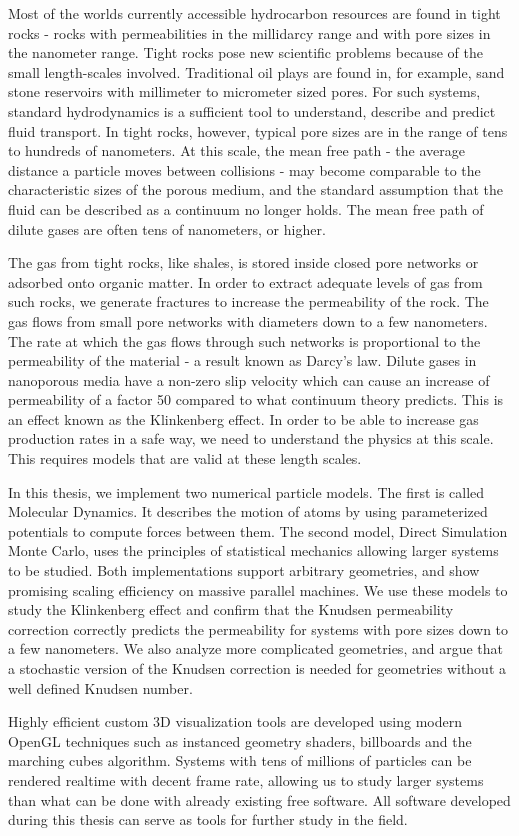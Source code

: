 Most of the worlds currently accessible hydrocarbon resources are found in tight rocks - rocks with permeabilities in the millidarcy range and with pore sizes in the nanometer range. Tight rocks pose new scientific problems because of the small length-scales involved. Traditional oil plays are found in, for example, sand stone reservoirs with millimeter to micrometer sized pores. For such systems, standard hydrodynamics is a sufficient tool to understand, describe and predict fluid transport. In tight rocks, however, typical pore sizes are in the range of tens to hundreds of nanometers. At this scale, the mean free path - the average distance a particle moves between collisions - may become comparable to the characteristic sizes of the porous medium, and the standard assumption that the fluid can be described as a continuum no longer holds. The mean free path of dilute gases are often tens of nanometers, or higher. 

The gas from tight rocks, like shales, is stored inside closed pore networks or adsorbed onto organic matter. In order to extract adequate levels of gas from such rocks, we generate fractures to increase the permeability of the rock. The gas flows from small pore networks with diameters down to a few nanometers. The rate at which the gas flows through such networks is proportional to the permeability of the material - a result known as Darcy's law. Dilute gases in nanoporous media have a non-zero slip velocity which can cause an increase of permeability of a factor 50 compared to what continuum theory predicts. This is an effect known as the Klinkenberg effect. In order to be able to increase gas production rates in a safe way, we need to understand the physics at this scale. This requires models that are valid at these length scales.

In this thesis, we implement two numerical particle models. The first is called Molecular Dynamics. It describes the motion of atoms by using parameterized potentials to compute forces between them. The second model, Direct Simulation Monte Carlo, uses the principles of statistical mechanics allowing larger systems to be studied. Both implementations support arbitrary geometries, and show promising scaling efficiency on massive parallel machines. We use these models to study the Klinkenberg effect and confirm that the Knudsen permeability correction correctly predicts the permeability for systems with pore sizes down to a few nanometers. We also analyze more complicated geometries, and argue that a stochastic version of the Knudsen correction is needed for geometries without a well defined Knudsen number. 

Highly efficient custom 3D visualization tools are developed using modern OpenGL techniques such as instanced geometry shaders, billboards and the marching cubes algorithm. Systems with tens of millions of particles can be rendered realtime with decent frame rate, allowing us to study larger systems than what can be done with already existing free software. All software developed during this thesis can serve as tools for further study in the field.